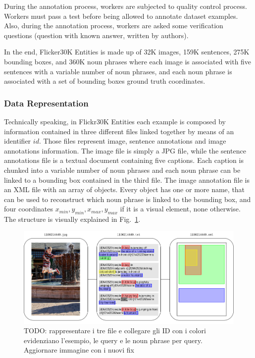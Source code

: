 During the annotation process, workers are subjected to quality
control process. Workers must pass a test before being allowed to
annotate dataset examples. Also, during the annotation process,
workers are asked some verification questions (question with known
answer, written by authors).

In the end, Flicker30K Entities is made up of 32K images, 159K
sentences, 275K bounding boxes, and 360K noun phrases where each image
is associated with five sentences with a variable number of noun
phrases, and each noun phrase is associated with a set of bounding
boxes ground truth coordinates. 

\subsubsection{Data Representation}
\label{subsec:flickr30k-data-representation}

Technically speaking, in Flickr30K Entities each example is composed
by information contained in three different files linked together by
means of an identifier $id$. Those files represent image, sentence
annotations and image annotations information. The image file is
simply a JPG file, while the sentence annotations file is a textual
document containing five captions. Each caption is chunked into a
variable number of noun phrases and each noun phrase can be linked to
a bounding box contained in the third file. The image annotation file
is an XML file with an array of objects. Every object has one or more
name, that can be used to reconstruct which noun phrase is linked to
the bounding box, and four coordinates $x_{min}, y_{min}, x_{max},
y_{max}$ if it is a visual element, none otherwise. The structure is
visually explained in
Fig.~\ref{fig:flickr30k-technical-data-representation}.

\begin{figure}
  \includegraphics[width=\textwidth]{figures/flickr30k-document-specification.png}
  \caption[TODO]{TODO: rappresentare i tre file e collegare gli ID con i colori evidenziano l'esempio, le query e le noun phrase per query. Aggiornare immagine con i nuovi fix}
  \label{fig:flickr30k-technical-data-representation}
\end{figure}

